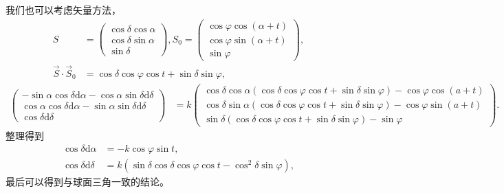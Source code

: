 \documentclass[11pt, a4paper, oneside]{ctexart}
\numberwithin{equation}{subsection}
\begin{document}
我们也可以考虑矢量方法，
\begin{align}
S&=\begin{pmatrix}
\cos\delta\cos\alpha\\
\cos\delta\sin\alpha\\
\sin\delta
\end{pmatrix},
S_0=\begin{pmatrix}
\cos\varphi\cos\left(\alpha+t\right)\\
\cos\varphi\sin\left(\alpha+t\right)\\
\sin\varphi
\end{pmatrix},\\
\vec S\cdot\vec S_0&=\cos\delta\cos\varphi\cos t+\sin\delta\sin\varphi,
\end{align}
\begin{align}
\begin{pmatrix}
-\sin\alpha\cos\delta\mathrm{d}\alpha-\cos\alpha\sin\delta\mathrm{d}\delta\\
\cos\alpha\cos\delta\mathrm{d}\alpha-\sin\alpha\sin\delta\mathrm{d}\delta\\
\cos\delta\mathrm{d}\delta
\end{pmatrix}&=k
\begin{pmatrix}
\cos\delta{}\cos\alpha\left(\cos\delta\cos\varphi\cos t+\sin\delta\sin\varphi\right)-\cos\varphi\cos\left(a+t\right)\\
\cos\delta{}\sin\alpha\left(\cos\delta\cos\varphi\cos t+\sin\delta\sin\varphi\right)-\cos\varphi\sin\left(a+t\right)\\
\sin\delta{}\left(\cos\delta\cos\varphi\cos t+\sin\delta\sin\varphi\right)-\sin\varphi
\end{pmatrix}.
\end{align}
整理得到
\begin{align}
\cos\delta\mathrm{d}\alpha&=-k\cos\varphi\sin t,\\
\cos\delta\mathrm{d}\delta&=k\left(\sin\delta\cos\delta\cos\varphi\cos t-\cos^2\delta\sin\varphi\right),
\end{align}
最后可以得到与球面三角一致的结论。
\end{document}
